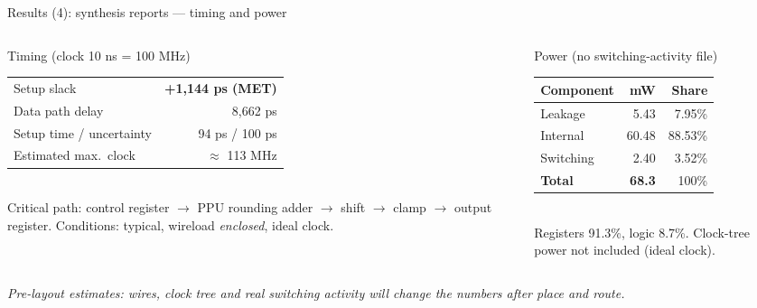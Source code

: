\documentclass[aspectratio=169,10pt,t]{beamer}
\begin{document}
\begin{frame}{Results (4): synthesis reports --- timing and power}
  \begin{columns}[T]
    \begin{column}{0.5\textwidth}
      \begin{block}{Timing (clock 10 ns = 100 MHz)}
        \footnotesize
        \renewcommand{\arraystretch}{1.15}
        \begin{tabular}{@{}lr@{}}
          \toprule
          Setup slack & \textbf{+1,144 ps (MET)}\\
          Data path delay & 8,662 ps\\
          Setup time / uncertainty & 94 ps / 100 ps\\
          Estimated max.\ clock & $\approx$ 113 MHz\\
          \bottomrule
        \end{tabular}\\[3pt]
        \scriptsize Critical path: control register $\to$ PPU rounding adder $\to$ shift $\to$ clamp $\to$ output register.
        Conditions: typical, wireload \emph{enclosed}, ideal clock.
      \end{block}
    \end{column}
    \begin{column}{0.48\textwidth}
      \begin{block}{Power (no switching-activity file)}
        \footnotesize
        \renewcommand{\arraystretch}{1.15}
        \begin{tabular}{@{}lrr@{}}
          \toprule
          \textbf{Component} & \textbf{mW} & \textbf{Share}\\
          \midrule
          Leakage & 5.43 & 7.95\%\\
          Internal & 60.48 & 88.53\%\\
          Switching & 2.40 & 3.52\%\\
          \midrule
          \textbf{Total} & \textbf{68.3} & 100\%\\
          \bottomrule
        \end{tabular}\\[3pt]
        \scriptsize Registers 91.3\%, logic 8.7\%. Clock-tree power not included (ideal clock).
      \end{block}
    \end{column}
  \end{columns}
  \vspace{2pt}
  \scriptsize\emph{Pre-layout estimates: wires, clock tree and real switching activity will change the numbers after place and route.}
\end{frame}
\end{document}
